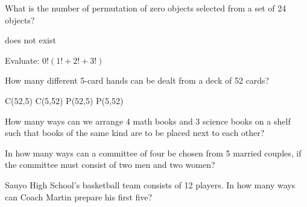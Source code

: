 \begin{questions}
\question What is the number of permutation of zero objects selected from a set of 24 objects?
\begin{multicols}{4}
\begin{choices} 
\choice does not exist  
\end{choices}
\end{multicols}

\question Evaluate: $0!(1!+2!+3!)$   
\begin{multicols}{4}
\begin{choices} 
\end{choices}
\end{multicols}

\question How many different 5-card hands can be dealt from a deck of 52 cards? 
\begin{multicols}{4}
\begin{choices} 
\CorrectChoice C(52,5)
\choice C(5,52)
\choice P(52,5) 
\choice P(5,52) 
\end{choices}
\end{multicols}

\question How many ways can we arrange 4 math books and 3 science books on a shelf such that books of the same kind are to be placed next to each other?
\begin{multicols}{4}
\begin{choices} 
\end{choices}
\end{multicols}


\question In how many ways can a committee of four be chosen from 5 married couples, if the committee must consist of two men and two women?
\begin{multicols}{4}
\begin{choices} 
\end{choices}
\end{multicols}


\question Sauyo High School's basketball team consists of 12 players. In how many ways can Coach Martin prepare his first five?
\begin{multicols}{4}
\begin{choices} 
\end{choices}
\end{multicols}


\end{questions}
